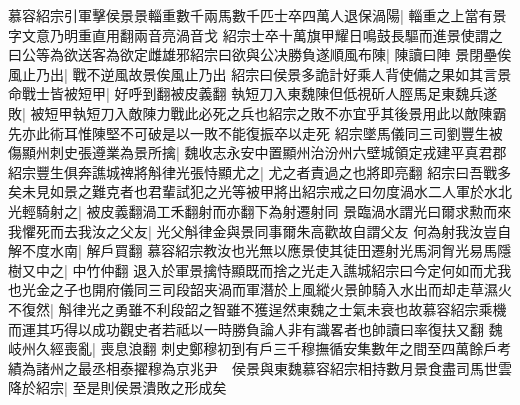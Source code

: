 慕容紹宗引軍擊侯景景輜重數千兩馬數千匹士卒四萬人退保渦陽|{
	輜重之上當有景字文意乃明重直用翻兩音亮渦音戈}
紹宗士卒十萬旗甲耀日鳴鼓長驅而進景使謂之曰公等為欲送客為欲定雌雄邪紹宗曰欲與公决勝負遂順風布陳|{
	陳讀曰陣}
景閉壘俟風止乃出|{
	戰不逆風故景俟風止乃出}
紹宗曰侯景多詭計好乘人背使備之果如其言景命戰士皆被短甲|{
	好呼到翻被皮義翻}
執短刀入東魏陳但低視斫人脛馬足東魏兵遂敗|{
	被短甲執短刀入敵陳力戰此必死之兵也紹宗之敗不亦宜乎其後景用此以敵陳霸先亦此術耳惟陳堅不可破是以一敗不能復振卒以走死}
紹宗墜馬儀同三司劉豐生被傷顯州刺史張遵業為景所擒|{
	魏收志永安中置顯州治汾州六壁城領定戎建平真君郡}
紹宗豐生俱奔譙城禆將斛律光張恃顯尤之|{
	尤之者責過之也將即亮翻}
紹宗曰吾戰多矣未見如景之難克者也君輩試犯之光等被甲將出紹宗戒之曰勿度渦水二人軍於水北光輕騎射之|{
	被皮義翻渦工禾翻射而亦翻下為射遷射同}
景臨渦水謂光曰爾求勲而來我懼死而去我汝之父友|{
	光父斛律金與景同事爾朱高歡故自謂父友}
何為射我汝豈自解不度水南|{
	解戶買翻}
慕容紹宗教汝也光無以應景使其徒田遷射光馬洞胷光易馬隱樹又中之|{
	中竹仲翻}
退入於軍景擒恃顯既而捨之光走入譙城紹宗曰今定何如而尤我也光金之子也開府儀同三司段韶夹渦而軍潛於上風縱火景帥騎入水出而却走草濕火不復然|{
	斛律光之勇雖不利段韶之智雖不獲逞然東魏之士氣未衰也故慕容紹宗乘機而運其巧得以成功觀史者若祗以一時勝負論人非有識畧者也帥讀曰率復扶又翻}
魏岐州久經喪亂|{
	喪息浪翻}
刺史鄭穆初到有戶三千穆撫循安集數年之間至四萬餘戶考績為諸州之最丞相泰擢穆為京兆尹　侯景與東魏慕容紹宗相持數月景食盡司馬世雲降於紹宗|{
	至是則侯景潰敗之形成矣}



